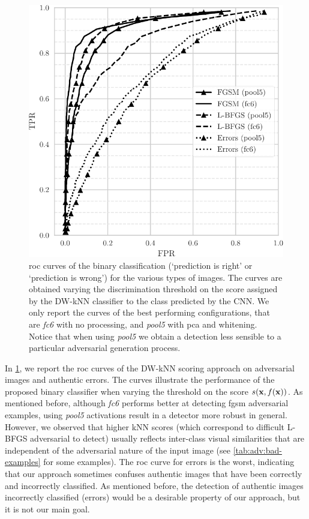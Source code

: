 \begin{figure}
\centering
\includegraphics[width=.85\linewidth]{roc}
\caption{\gls{roc} curves of the binary classification (`prediction is right' or `prediction is wrong') for the various types of images.
The curves are obtained varying the discrimination threshold on the score assigned by the DW-kNN classifier to the class predicted by the CNN.
We only report the curves of the best performing configurations, that are \emph{fc6} with no processing, and \emph{pool5} with \gls{pca} and whitening.
Notice that when using \emph{pool5} we obtain a detection less sensible to a particular adversarial generation process.}
\label{fig:adv:roc}
\end{figure}

In \ref{fig:adv:roc}, we report the \acrfull{roc} curves of the DW-kNN scoring approach on adversarial images and authentic errors.
The curves illustrate the performance of the proposed binary classifier when varying the threshold on the score $s(\mathbf{x}, f(\mathbf{x}))$.
As mentioned before, although \emph{fc6} performs better at detecting \gls{fgsm} adversarial examples, using \emph{pool5} activations result in a detector more robust in general.
However, we observed that higher kNN scores (which correspond to difficult L-BFGS adversarial to detect) usually reflects inter-class visual similarities that are independent of the adversarial nature of the input image (see \ref{tab:adv:bad-examples} for some examples).
The \gls{roc} curve for errors is the worst, indicating that our approach sometimes confuses authentic images that have been correctly and incorrectly classified.
As mentioned before, the detection of authentic images incorrectly classified (errors) would be a desirable property of our approach, but it is not our main goal.

